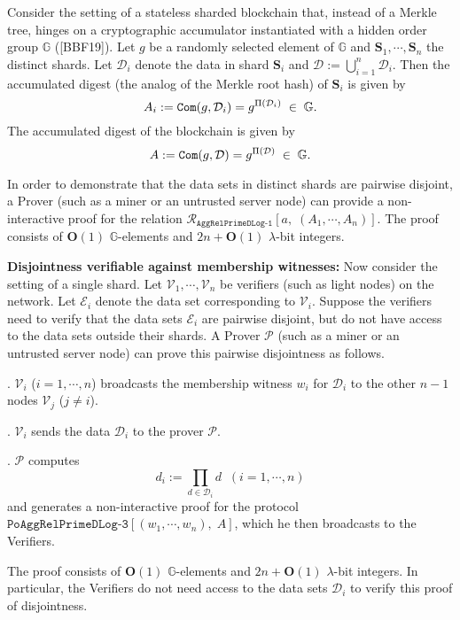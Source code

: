 \documentclass[11pt, lettersize, notitlepage, leqno, footskip=0.6cm]{article}
\newcommand{\pl}{\prod\limits}
\newcommand{\ttt}{\texttt}
\newcommand{\bG}{\mathbb{G}}
\newcommand{\mc}{\mathcal}
\newcommand{\mb}{\mathbb}
\newcommand{\mbf}{\mathbf}
\newcommand{\lam}{\lambda}
\newcommand{\bO}{\mbf{O}}
\newcommand{\mP}{\mc{P}}
\newcommand{\V}{\mc{V}}
\newcommand{\vs}{\vspace{-0.15cm}}
\newcommand{\noin}{\noindent}
\numberwithin{equation}{section}
\begin{document}
Consider the setting of a stateless sharded blockchain that, instead of a Merkle tree, hinges on a cryptographic accumulator instantiated with a hidden order group $\mb{G}$ ([BBF19]). Let $g$ be a randomly selected element of $\mb{G}$ and $\mbf{S}_1,\cdots, \mbf{S}_n$ the distinct shards. Let $\mc{D}_i$ denote the data in shard $\mbf{S}_i$ and $\mc{D}:= \bigcup\limits_{i=1}^n \mc{D}_i$. Then the accumulated digest (the analog of the Merkle root hash) of $\mbf{S}_i$ is given by \vs $$A_i:= \ttt{Com}(g, \mc{D}_i) = g^{\Pi(\mc{D}_i)}\;\in\;\bG. \vs $$  The accumulated digest of the blockchain is given by \vs $$A:= \ttt{Com}(g, \mc{D}) = g^{\Pi(\mc{D})}\;\in\;\bG. \vs $$

In order to demonstrate that the data sets in distinct shards are pairwise disjoint, a Prover (such as a miner or an untrusted server node) can provide a non-interactive proof for the relation \hyperlink{RP1}{$\mc{R}_{\ttt{AggRelPrimeDLog-1}}[a,\;(A_1,\cdots,A_n) ].$} The proof consists of $\bO(1)$ $\bG$-elements and $2n+\bO(1)$ $\lam$-bit integers.


\bigskip

\noin \textbf{Disjointness verifiable against membership witnesses:} Now consider the setting of a single shard. Let $\V_1,\cdots,\V_n$ be verifiers (such as light nodes) on the network. Let $\mc{E}_i$ denote the data set corresponding to $\V_i$. Suppose the verifiers need to verify that the data sets $\mc{E}_i$ are pairwise disjoint, but do not have access to the data sets outside their shards. A Prover $\mP$ (such as a miner or an untrusted server node) can prove this pairwise disjointness as follows.\vspace{0.1cm}

\noin 1. $\V_i$ ($i=1,\cdots,n$) broadcasts the membership witness $w_i$ for $\mc{D}_i$ to the other $n-1$ nodes $\V_j$ ($j\neq i$). 

\noin 2. $\V_i$ sends the data $\mc{D}_i$ to the prover $\mP$.

\noin 3. $\mP$ computes \vs $$d_i:= \pl_{d\in\mc{D}_i} d\;\;(i=1,\cdots,n)$$ and generates a non-interactive proof for the protocol \hyperlink{RP3}{$\ttt{PoAggRelPrimeDLog-3}[(w_1,\cdots,w_n),\; A]$}, which he then broadcasts to the Verifiers.

The proof consists of $\bO(1)$ $\bG$-elements and $2n+\bO(1)$ $\lam$-bit integers. In particular, the Verifiers do not need access to the data sets $\mc{D}_i$ to verify this proof of disjointness.
\end{document}
